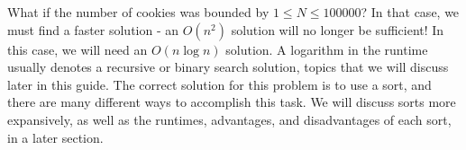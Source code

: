 What if the number of cookies was bounded by $ 1 \leq N \leq 100000 $?  In that case, we must find a faster solution - an $ O(n^2) $ solution will no longer be sufficient! In this case, we will need an $ O(n\log n) $ solution.  A logarithm in the runtime usually denotes a recursive or binary search solution, topics that we will discuss later in this guide.  The correct solution for this problem is to use a sort, and there are many different ways to accomplish this task.  We will discuss sorts more expansively, as well as the runtimes, advantages, and disadvantages of each sort, in a later section.
